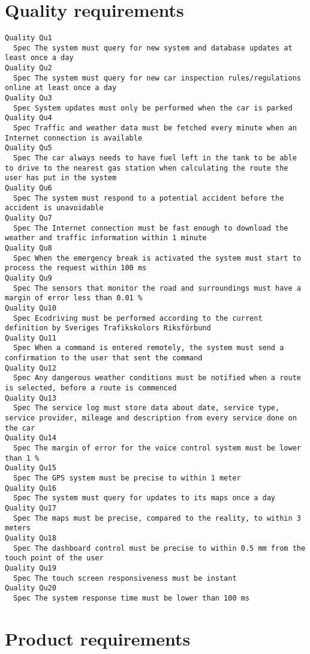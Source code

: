         
       \section{Quality requirements}


\begin{lstlisting}
Quality Qu1
  Spec The system must query for new system and database updates at least once a day
Quality Qu2
  Spec The system must query for new car inspection rules/regulations online at least once a day
Quality Qu3
  Spec System updates must only be performed when the car is parked
Quality Qu4
  Spec Traffic and weather data must be fetched every minute when an Internet connection is available
Quality Qu5
  Spec The car always needs to have fuel left in the tank to be able to drive to the nearest gas station when calculating the route the user has put in the system
Quality Qu6
  Spec The system must respond to a potential accident before the accident is unavoidable
Quality Qu7
  Spec The Internet connection must be fast enough to download the weather and traffic information within 1 minute
Quality Qu8
  Spec When the emergency break is activated the system must start to process the request within 100 ms
Quality Qu9
  Spec The sensors that monitor the road and surroundings must have a margin of error less than 0.01 %
Quality Qu10
  Spec Ecodriving must be performed according to the current definition by Sveriges Trafikskolors Riksförbund
Quality Qu11
  Spec When a command is entered remotely, the system must send a confirmation to the user that sent the command
Quality Qu12
  Spec Any dangerous weather conditions must be notified when a route is selected, before a route is commenced
Quality Qu13
  Spec The service log must store data about date, service type, service provider, mileage and description from every service done on the car
Quality Qu14
  Spec The margin of error for the voice control system must be lower than 1 %
Quality Qu15
  Spec The GPS system must be precise to within 1 meter
Quality Qu16
  Spec The system must query for updates to its maps once a day
Quality Qu17
  Spec The maps must be precise, compared to the reality, to within 3 meters
Quality Qu18
  Spec The dashboard control must be precise to within 0.5 mm from the touch point of the user
Quality Qu19
  Spec The touch screen responsiveness must be instant
Quality Qu20
  Spec The system response time must be lower than 100 ms

\end{lstlisting}
    
        
       \section{Product requirements}


